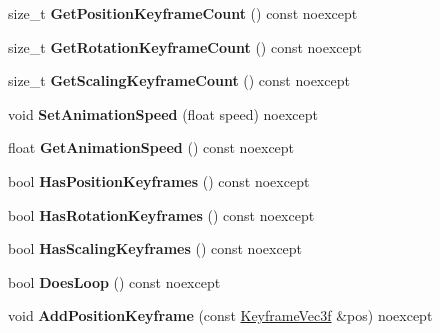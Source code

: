 \begin{DoxyCompactItemize}
\item 
\mbox{\label{class_blade_1_1_animation_a1d3434e2e65348e77ef78aa4bffd0a42}} 
size\+\_\+t {\bfseries Get\+Position\+Keyframe\+Count} () const noexcept
\item 
\mbox{\label{class_blade_1_1_animation_a99e271bc36e1bbed6488c00fccad93b6}} 
size\+\_\+t {\bfseries Get\+Rotation\+Keyframe\+Count} () const noexcept
\item 
\mbox{\label{class_blade_1_1_animation_a6903d3a3728f6cc339f623e44a937bfc}} 
size\+\_\+t {\bfseries Get\+Scaling\+Keyframe\+Count} () const noexcept
\item 
\mbox{\label{class_blade_1_1_animation_acbfde9c9cc2a75322cea288f6fcd9789}} 
void {\bfseries Set\+Animation\+Speed} (float speed) noexcept
\item 
\mbox{\label{class_blade_1_1_animation_a55b59bafd53b9e38ad71b38cbc3e2ff0}} 
float {\bfseries Get\+Animation\+Speed} () const noexcept
\item 
\mbox{\label{class_blade_1_1_animation_a0d32b8a4ca6f549cce9842a7d8d5ff84}} 
bool {\bfseries Has\+Position\+Keyframes} () const noexcept
\item 
\mbox{\label{class_blade_1_1_animation_a6325e0249448d0cd7b1b780872906580}} 
bool {\bfseries Has\+Rotation\+Keyframes} () const noexcept
\item 
\mbox{\label{class_blade_1_1_animation_a7886bf10e255deaafbb358e059195688}} 
bool {\bfseries Has\+Scaling\+Keyframes} () const noexcept
\item 
\mbox{\label{class_blade_1_1_animation_a255de6c54b74c466b0f140292cf0e7d4}} 
bool {\bfseries Does\+Loop} () const noexcept
\item 
\mbox{\label{class_blade_1_1_animation_a143e5c92e121518649af8a66758df4ff}} 
void {\bfseries Add\+Position\+Keyframe} (const \hyperlink{struct_blade_1_1_keyframe}{Keyframe\+Vec3f} \&pos) noexcept

\end{DoxyCompactItemize}
